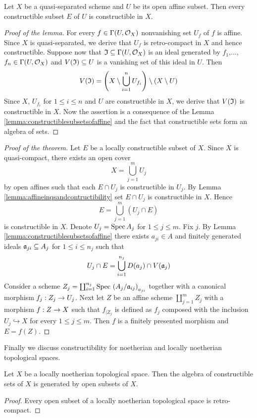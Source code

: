 \begin{lemma}\label{lemma:affineinqsandcontructibility}
Let $X$ be a quasi-separated scheme and $U$ be its open affine subset. Then every constructible subset $E$ of $U$ is constructible in $X$.
\end{lemma}
\begin{proof}[Proof of the lemma]
For every $f\in \Gamma(U,{\mathcal O}_X)$ nonvanishing set $U_f$ of $f$ is affine. Since $X$ is quasi-separated, we derive that $U_f$ is retro-compact in $X$ and hence constructible. Suppose now that $\mathfrak{I}\subseteq \Gamma(U,{\mathcal O}_X)$ is an ideal generated by $f_1$,...,$f_n\in \Gamma(U,{\mathcal O}_X)$ and $V(\mathfrak{I})\subseteq U$ is a vanishing set of this ideal in $U$. Then
$$V(\mathfrak{I}) = \left(X\setminus \bigcup_{i=1}^nU_{f_i}\right)\setminus \left(X\setminus U\right)$$
Since $X$, $U_{f_i}$ for $1\leq i\leq n$ and $U$ are constructible in $X$, we derive that $V(\mathfrak{I})$ is constructible in $X$. Now the assertion is  a consequence of the Lemma \ref{lemma:constructiblesubsetsofaffine} and the fact that constructible sets form an algebra of sets.
\end{proof}

\begin{proof}[Proof of the theorem]
Let $E$ be a locally constructible subset of $X$. Since $X$ is quasi-compact, there exists an open cover 
$$X = \bigcup_{j=1}^mU_j$$
by open affines such that each $E\cap U_j$ is constructible in $U_j$. By Lemma \ref{lemma:affineinqsandcontructibility} set $E\cap U_j$ is constructible in $X$. Hence
$$E = \bigcup_{j=1}^m\left(U_j\cap E\right)$$
is constructible in $X$. Denote $U_j = \mathrm{Spec}\, A_j$ for $1\leq j\leq m$. Fix $j$. By Lemma \ref{lemma:constructiblesubsetsofaffine} there exists $a_{ji}\in A$ and finitely generated ideals $\mathfrak{a}_{ji}\subseteq A_j$ for $1\leq i\leq n_j$ such that
$$U_j\cap E = \bigcup_{i=1}^{n_j}D(a_j)\cap V(\mathfrak{a}_j)$$
Consider a scheme $Z_j = \coprod_{i=1}^{n_j}\mathrm{Spec}\, \left(A_j/\mathfrak{a}_{ij}\right)_{a_{ji}}$ together with a canonical morphism $f_j:Z_j\rightarrow U_j$. Next let $Z$ be an affine scheme $\coprod_{j=1}^mZ_j$ with a morphism $f:Z\rightarrow X$ such that $f_{\mid Z_j}$ is defined as $f_j$ composed with the inclusion $U_j\hookrightarrow X$ for every $1\leq j\leq m$. Then $f$ is a finitely presented morphism and $E = f(Z)$. 
\end{proof}
\noindent
Finally we discuss constructibility for noetherian and locally noetherian topological spaces. 

\begin{fact}\label{fact:constructibleonlocallynoetherian}
Let $X$ be a locally noetherian topological space. Then the algebra of constructible sets of $X$ is generated by open subsets of $X$.
\end{fact}
\begin{proof}
Every open subset of a locally noetherian topological space is retro-compact.
\end{proof}

